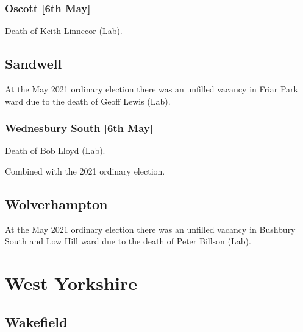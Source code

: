 \documentclass[a4paper,openany]{book}
\begin{document}
\begin{resultsiii}
\subsubsection*{Oscott \hspace*{\fill}\nolinebreak[1]%
	\enspace\hspace*{\fill}
	[6th May]}


Death of Keith Linnecor (Lab).

\subsection*{Sandwell}

At the May 2021 ordinary election there was an unfilled vacancy in Friar Park ward due to the death of Geoff Lewis (Lab).

\subsubsection*{Wednesbury South \hspace*{\fill}\nolinebreak[1]%
	\enspace\hspace*{\fill}
	[6th May]}


Death of Bob Lloyd (Lab).

Combined with the 2021 ordinary election.

\subsection*{Wolverhampton}

At the May 2021 ordinary election there was an unfilled vacancy in Bushbury South and Low Hill ward due to the death of Peter Billson (Lab).

\section{West Yorkshire}

\subsection*{Wakefield}


\end{resultsiii}
\end{document}
